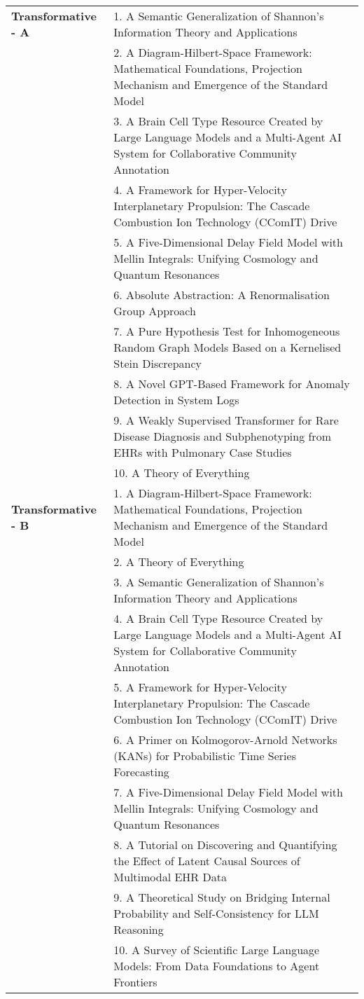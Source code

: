 \documentclass{article}
\begin{document}
\begin{longtable}{p{2.5cm}p{13cm}}
\textbf{Transformative - A} & 1. A Semantic Generalization of Shannon's Information Theory and Applications \\
& 2. A Diagram-Hilbert-Space Framework: Mathematical Foundations, Projection Mechanism and Emergence of the Standard Model \\
& 3. A Brain Cell Type Resource Created by Large Language Models and a Multi-Agent AI System for Collaborative Community Annotation \\
& 4. A Framework for Hyper-Velocity Interplanetary Propulsion: The Cascade Combustion Ion Technology (CComIT) Drive \\
& 5. A Five-Dimensional Delay Field Model with Mellin Integrals: Unifying Cosmology and Quantum Resonances \\
& 6. Absolute Abstraction: A Renormalisation Group Approach \\
& 7. A Pure Hypothesis Test for Inhomogeneous Random Graph Models Based on a Kernelised Stein Discrepancy \\
& 8. A Novel GPT-Based Framework for Anomaly Detection in System Logs \\
& 9. A Weakly Supervised Transformer for Rare Disease Diagnosis and Subphenotyping from EHRs with Pulmonary Case Studies \\
& 10. A Theory of Everything \\
\midrule

\textbf{Transformative - B} & 1. A Diagram-Hilbert-Space Framework: Mathematical Foundations, Projection Mechanism and Emergence of the Standard Model \\
& 2. A Theory of Everything \\
& 3. A Semantic Generalization of Shannon's Information Theory and Applications \\
& 4. A Brain Cell Type Resource Created by Large Language Models and a Multi-Agent AI System for Collaborative Community Annotation \\
& 5. A Framework for Hyper-Velocity Interplanetary Propulsion: The Cascade Combustion Ion Technology (CComIT) Drive \\
& 6. A Primer on Kolmogorov-Arnold Networks (KANs) for Probabilistic Time Series Forecasting \\
& 7. A Five-Dimensional Delay Field Model with Mellin Integrals: Unifying Cosmology and Quantum Resonances \\
& 8. A Tutorial on Discovering and Quantifying the Effect of Latent Causal Sources of Multimodal EHR Data \\
& 9. A Theoretical Study on Bridging Internal Probability and Self-Consistency for LLM Reasoning \\
& 10. A Survey of Scientific Large Language Models: From Data Foundations to Agent Frontiers \\
\midrule


\end{longtable}
\end{document}
